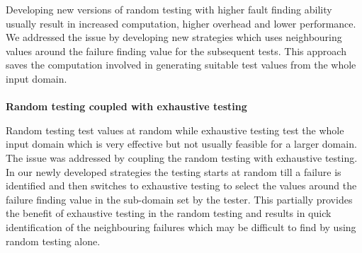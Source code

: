 Developing new versions of random testing with higher fault finding ability usually result in increased computation, higher overhead and lower performance. We addressed the issue by developing new strategies which uses neighbouring values around the failure finding value for the subsequent tests. This approach saves the computation involved in generating suitable test values from the whole input domain. \\
\\

\textbf{Random testing coupled with exhaustive testing}

Random testing test values at random while exhaustive testing test the whole input domain which is very effective but not usually feasible for a larger domain. The issue was addressed by coupling the random testing with exhaustive testing. In our newly developed strategies the testing starts at random till a failure is identified and then switches to exhaustive testing to select the values around the failure finding value in the sub-domain set by the tester. This partially provides the benefit of exhaustive testing in the random testing and results in quick identification of the neighbouring failures which may be difficult to find by using random testing alone.\\







